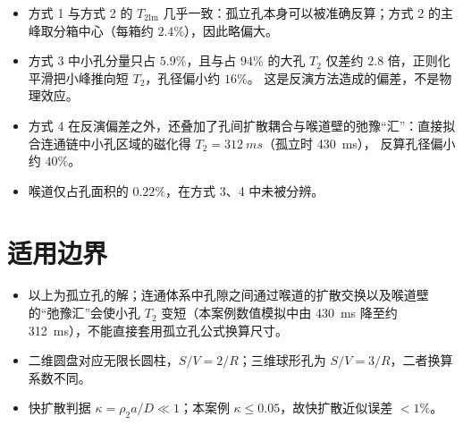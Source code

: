\documentclass[11pt,a4paper]{article}
\begin{document}
\begin{itemize}
\item 方式 1 与方式 2 的 $T_{2\mathrm{lm}}$ 几乎一致：孤立孔本身可以被准确反算；方式 2 的主峰取分箱中心（每箱约 $2.4\%$），因此略偏大。
\item 方式 3 中小孔分量只占 $5.9\%$，且与占 $94\%$ 的大孔 $T_2$ 仅差约 $2.8$ 倍，正则化平滑把小峰推向短 $T_2$，孔径偏小约 $16\%$。
  这是反演方法造成的偏差，不是物理效应。
\item 方式 4 在反演偏差之外，还叠加了孔间扩散耦合与喉道壁的弛豫“汇”：直接拟合连通链中小孔区域的磁化得 $T_2=\SI{312}{ms}$（孤立时 \SI{430}{ms}），
  反算孔径偏小约 $40\%$。
\item 喉道仅占孔面积的 $0.22\%$，在方式 3、4 中未被分辨。
\end{itemize}

\section{适用边界}

\begin{itemize}
\item 以上为孤立孔的解；连通体系中孔隙之间通过喉道的扩散交换以及喉道壁的“弛豫汇”会使小孔 $T_2$ 变短（本案例数值模拟中由 \SI{430}{ms} 降至约 \SI{312}{ms}），不能直接套用孤立孔公式换算尺寸。
\item 二维圆盘对应无限长圆柱，$S/V=2/R$；三维球形孔为 $S/V=3/R$，二者换算系数不同。
\item 快扩散判据 $\kappa=\rho_2a/D\ll1$；本案例 $\kappa\le0.05$，故快扩散近似误差 $<1\%$。
\end{itemize}
\end{document}
